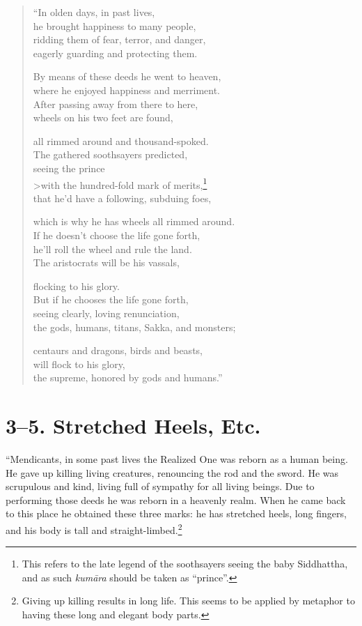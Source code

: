 \documentclass[12pt,openany]{book}%
\begin{document}
\begin{verse}%
“In olden days, in past lives, \\
he brought happiness to many people, \\
ridding them of fear, terror, and danger, \\
eagerly guarding and protecting them. 

By means of these deeds he went to heaven, \\
where he enjoyed happiness and merriment. \\
After passing away from there to here, \\
wheels on his two feet are found, 

all rimmed around and thousand-spoked. \\
The gathered soothsayers predicted, \\
seeing the prince \\>with the hundred-fold mark of merits,\footnote{This refers to the late legend of the soothsayers seeing the baby Siddhattha, and as such \textit{\textsanskrit{kumāra}} should be taken as “prince”. } \\
that he’d have a following, subduing foes, 

which is why he has wheels all rimmed around. \\
If he doesn’t choose the life gone forth, \\
he’ll roll the wheel and rule the land. \\
The aristocrats will be his vassals, 

flocking to his glory. \\
But if he chooses the life gone forth, \\
seeing clearly, loving renunciation, \\
the gods, humans, titans, Sakka, and monsters; 

centaurs and dragons, birds and beasts, \\
will flock to his glory, \\
the supreme, honored by gods and humans.” 

%
\end{verse}

\section*{3–5. Stretched Heels, Etc. }

“Mendicants, in some past lives the Realized One was reborn as a human being. He gave up killing living creatures, renouncing the rod and the sword. He was scrupulous and kind, living full of sympathy for all living beings. Due to performing those deeds he was reborn in a heavenly realm. When he came back to this place he obtained these three marks: he has stretched heels, long fingers, and his body is tall and straight-limbed.\footnote{Giving up killing results in long life. This seems to be applied by metaphor to having these long and elegant body parts. } 
\end{document}
